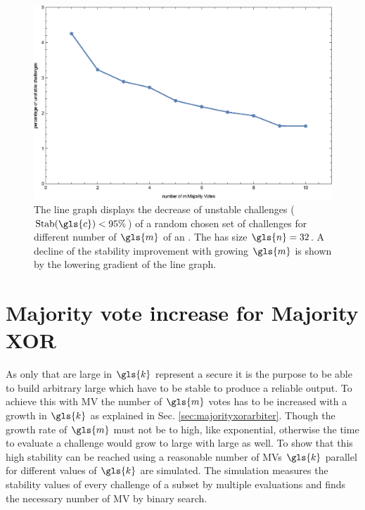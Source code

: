 \begin{figure}[ht]
\includegraphics[width=1.00\textwidth]{images/single-votes-stab-simulation.eps}
\caption{The line graph displays the decrease of unstable challenges ($\Stab(\gls{c}) < 95 \%$) of a random chosen set of challenges for different number of $\gls{m}$ of an \mpuf.
The \mpuf has size $\gls{n} = 32$.
A decline of the stability improvement with growing $\gls{m}$ is shown by the lowering gradient of the line graph.
} 
\label{fig:majorityvotestabilityimprovement}
\end{figure}


\section{Majority vote increase for Majority \acs{XOR} \apufs}
\label{sec:majorityvotegrowth}

As only \xpufs that are large in $\gls{k}$ represent a secure \puf it is the purpose to be able to build arbitrary large \xpufs which have to be stable to produce a reliable output.
To achieve this with \ac{MV} the number of $\gls{m}$ votes has to be increased with a growth in $\gls{k}$ as explained in Sec. \ref{sec:majorityxorarbiter}.
Though the growth rate of $\gls{m}$ must not be to high, like exponential, otherwise the time to evaluate a challenge would grow to large with large \xpufs as well.
To show that this high stability can be reached using a reasonable number of \acp{MV} $\gls{k}$ parallel \mpufs for different values of $\gls{k}$ are simulated.
The simulation measures the stability values of every challenge of a subset by multiple evaluations and finds the necessary number of \ac{MV} by binary search.

